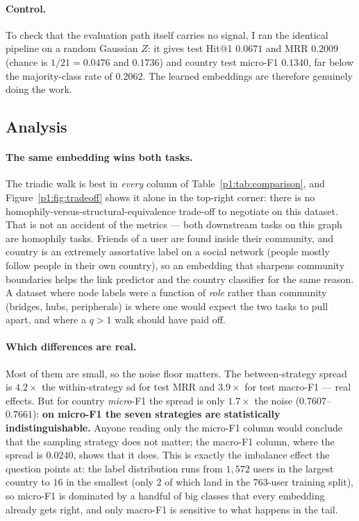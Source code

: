 \paragraph{Control.}
To check that the evaluation path itself carries no signal, I ran the identical pipeline
on a random Gaussian $Z$: it gives test Hit@1 $0.0671$ and MRR $0.2009$ (chance is
$1/21=0.0476$ and $0.1736$) and country test micro-F1 $0.1340$, far below the
majority-class rate of $0.2062$.  The learned embeddings are therefore genuinely doing
the work.

\subsection{Analysis}
\label{p1:sec:analysis}

\paragraph{The same embedding wins both tasks.}
The triadic walk is best in \emph{every} column of Table~\ref{p1:tab:comparison}, and
Figure~\ref{p1:fig:tradeoff} shows it alone in the top-right corner: there is no
homophily-versus-structural-equivalence trade-off to negotiate on this dataset.  That is
not an accident of the metrics --- both downstream tasks on this graph are homophily
tasks.  Friends of a user are found inside their community, and country is an extremely
assortative label on a social network (people mostly follow people in their own country),
so an embedding that sharpens community boundaries helps the link predictor and the
country classifier for the same reason.  A dataset where node labels were a function of
\emph{role} rather than community (bridges, hubs, peripherals) is where one would expect
the two tasks to pull apart, and where a $q>1$ walk should have paid off.

\paragraph{Which differences are real.}
Most of them are small, so the noise floor matters.  The between-strategy spread is
$4.2\times$ the within-strategy sd for test MRR and $3.9\times$ for test macro-F1 --- real
effects.  But for country \emph{micro}-F1 the spread is only $1.7\times$ the noise
($0.7607$--$0.7661$): \textbf{on micro-F1 the seven strategies are statistically
indistinguishable.}  Anyone reading only the micro-F1 column would conclude that the
sampling strategy does not matter; the macro-F1 column, where the spread is $0.0240$,
shows that it does.  This is exactly the imbalance effect the question points at: the
label distribution runs from $1{,}572$ users in the largest country to $16$ in the
smallest (only $2$ of which land in the $763$-user training split), so micro-F1 is
dominated by a handful of big classes that every embedding already gets right, and only
macro-F1 is sensitive to what happens in the tail.


